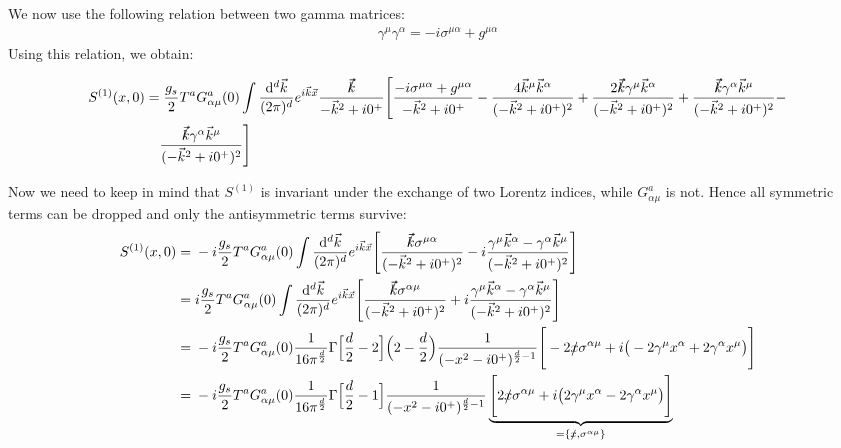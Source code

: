 \documentclass[openright,twoside,12pt,a4paper,final]{article}
\begin{document}
	We now use the following relation between two gamma matrices:
	\begin{align}
		\gamma^{\mu} \gamma^{\alpha} = -i \sigma^{\mu \alpha} + g^{\mu \alpha}
	\end{align}
	Using this relation, we obtain:
	\begin{footnotesize}
	\begin{align}
		S^{(1)}(x,0) =& \;\frac{g_s}{2} T^a G^a_{\alpha \mu}(0) \int \frac{\mathrm{d}^d\vec{k}}{(2 \pi)^d} e^{i\vec{k}\vec{x}} \frac{\slashed{\vec{k}}}{-\vec{k}^2 + i0^+} \Bigg[ \frac{-i \sigma^{\mu \alpha} + g^{\mu \alpha}}{-\vec{k}^2 + i0^+} - \frac{4 \vec{k}^{\mu} \vec{k}^{\alpha}}{(-\vec{k}^2 + i0^+)^2} + \frac{2 \slashed{\vec{k}} \gamma^{\mu} \vec{k}^{\alpha}}{(-\vec{k}^2 + i0^+)^2} +  \frac{ \slashed{\vec{k}} \gamma^{\alpha} \vec{k}^{\mu}}{(-\vec{k}^2 + i0^+)^2} -  \\& \frac{ \slashed{\vec{k}} \gamma^{\alpha} \vec{k}^{\mu}}{(-\vec{k}^2 + i0^+)^2} \Bigg] \nonumber
	\end{align}
	\end{footnotesize} \normalsize
	\noindent
	Now we need to keep in mind that $S^{(1)}$ is invariant under the exchange of two Lorentz indices, while $G^a_{\alpha \mu}$ is not. Hence all symmetric terms can be dropped and only the antisymmetric terms survive:
	\begin{align}
		S^{(1)}(x,0) =& \; -i \frac{g_s}{2} T^a G^a_{\alpha \mu}(0) \int \frac{\mathrm{d}^d\vec{k}}{(2 \pi)^d} e^{i\vec{k}\vec{x}} \Bigg[ \frac{\slashed{\vec{k}} \sigma^{\mu \alpha}}{(-\vec{k}^2 + i0^+)^2} - i\frac{ \gamma^{\mu} \vec{k}^{\alpha} - \gamma^{\alpha} \vec{k}^{\mu}}{(-\vec{k}^2 + i0^+)^2} \Bigg] \nonumber \\ =& \; i \frac{g_s}{2} T^a G^a_{\alpha \mu}(0) \int \frac{\mathrm{d}^d\vec{k}}{(2 \pi)^d} e^{i\vec{k}\vec{x}} \Bigg[ \frac{\slashed{\vec{k}} \sigma^{ \alpha \mu}}{(-\vec{k}^2 + i0^+)^2} + i\frac{ \gamma^{\mu} \vec{k}^{\alpha} - \gamma^{\alpha} \vec{k}^{\mu}}{(-\vec{k}^2 + i0^+)^2} \Bigg] \nonumber \\ =& \; -i \frac{g_s}{2} T^a G^a_{\alpha \mu}(0) \frac{1}{16 \pi^\frac{d}{2}} \Gamma\Big[\frac{d}{2} - 2\Big] \Big(2 - \frac{d}{2}\Big) \frac{1}{(-x^2 - i0^+)^{\frac{d}{2} - 1}} \Bigg[ -2\slashed{x} \sigma^{ \alpha \mu} + i\big( -2 \gamma^{\mu} x^{\alpha} +2 \gamma^{\alpha} x^{\mu}\big) \Bigg] \nonumber \\ =& \; -i \frac{g_s}{2} T^a G^a_{\alpha \mu}(0) \frac{1}{16 \pi^\frac{d}{2}} \Gamma\Big[\frac{d}{2} - 1\Big]  \frac{1}{(-x^2 - i0^+)^{\frac{d}{2} - 1}} \underbrace{\Bigg[ 2\slashed{x} \sigma^{ \alpha \mu} + i \big( 2 \gamma^{\mu} x^{\alpha} - 2 \gamma^{\alpha} x^{\mu}\big) \Bigg]}_{ = \{\slashed{x},\sigma^{\alpha \mu}\}} \nonumber
	\end{align}
\end{document}
